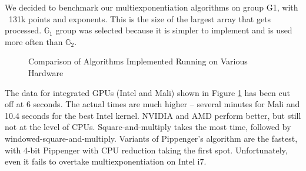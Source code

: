 We decided to benchmark our multiexponentiation algorithms on group G1, with ~131k points and exponents. This is the size of the largest array that gets processed. $\mathbb{G}_1$ group was selected because it is simpler to implement and is used more often than $\mathbb{G}_2$.
\begin{figure}[h]
    \begin{center}
    \caption{Comparison of Algorithms Implemented Running on Various Hardware}
    \label{fig:finalresults}
    \end{center}
\end{figure}
 \noindent The data for integrated GPUs (Intel and Mali) shown in Figure \ref{fig:finalresults} has been cut off at 6 seconds. The actual times are much higher -- several minutes for Mali and 10.4 seconds for the best Intel kernel. NVIDIA and AMD perform better, but still not at the level of CPUs. Square-and-multiply takes the most time, followed by windowed-square-and-multiply. Variants of Pippenger's algorithm are the fastest, with 4-bit Pippenger with CPU reduction taking the first spot. Unfortunately, even it fails to overtake multiexponentiation on Intel i7.
